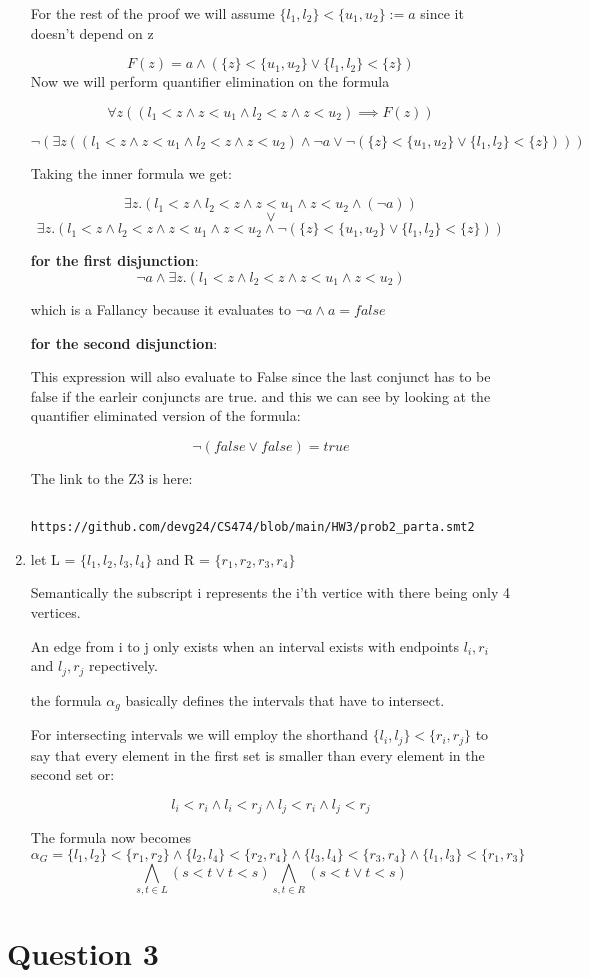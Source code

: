 \documentclass{article}
\begin{document}
\begin{enumerate}[label=(\alph*)]
        For the rest of the proof we will assume $\{l_1,l_2\} < \{u_1,u_2 \} := a$ since it doesn't depend on z

        $$F(z) = a \land (\{z\} < \{u_1, u_2\} \lor \{l_1,l_2\} < \{z\})$$
     Now we will perform quantifier elimination on the formula 

     $$\forall z ((l_1 < z \land z < u_1 \land l_2 < z \land z < u_2) \implies F(z) ) $$

     $$\neg( \exists z ((l_1 < z \land z < u_1 \land l_2 < z \land z < u_2) \land \neg a \lor \neg(\{z\} < \{u_1, u_2\} \lor \{l_1,l_2\} < \{z\}) )) $$

     Taking the inner formula we get:

     $$\exists z. (l_1 < z \land l_2 < z \land z < u_1 \land z < u_2 \land (\neg a))$$
     $$\lor$$
     $$ \exists z. (l_1 < z \land l_2 < z \land z < u_1 \land z < u_2 \land \neg(\{z\} < \{u_1, u_2\} \lor \{l_1,l_2\} < \{z\}))$$

     \textbf{for the first disjunction}:
     $$\neg a \land \exists z. (l_1 < z \land l_2 < z \land z < u_1 \land z < u_2)$$

     which is a Fallancy because it evaluates to $\neg a \land a = false$

     \textbf{for the second disjunction}:

     This expression will also evaluate to False since the last conjunct has to be false if the earleir conjuncts are true. and this we can see by looking at the quantifier eliminated version of the formula:

     $$\neg (false \lor false) = true$$

     The link to the Z3 is here: \begin{verbatim}
        https://github.com/devg24/CS474/blob/main/HW3/prob2_parta.smt2
     \end{verbatim}

    \newpage

    \item let L = $\{l_1,l_2,l_3,l_4\}$ and R = $\{r_1,r_2,r_3,r_4\}$
    
    Semantically the subscript i represents the i'th vertice with there being only 4 vertices.

    An edge from i to j only exists when an interval exists with endpoints $l_i, r_i$ and $l_j, r_j$ repectively.

    the formula $\alpha_g$ basically defines the intervals that have to intersect.

    For intersecting intervals we will employ the shorthand $\{l_i, l_j\} < \{r_i,r_j\}$ to say that every element in the first set is smaller than every element in the second set or:

    $$l_i < r_i \land l_i < r_j \land l_j < r_i \land l_j < r_j$$

    The formula now becomes
    $$\alpha_G = \{l_1,l_2\} < \{r_1,r_2\} \land \{l_2,l_4\} < \{r_2,r_4\} \land \{l_3,l_4\} < \{r_3, r_4\} \land \{l_1, l_3\} < \{r_1, r_3\}$$
    $$ \bigwedge_{s ,t \in L}(s < t \lor t < s) \bigwedge_{s,t \in R}(s < t \lor t < s)$$     
\end{enumerate}

\section{Question 3}
\end{document}
